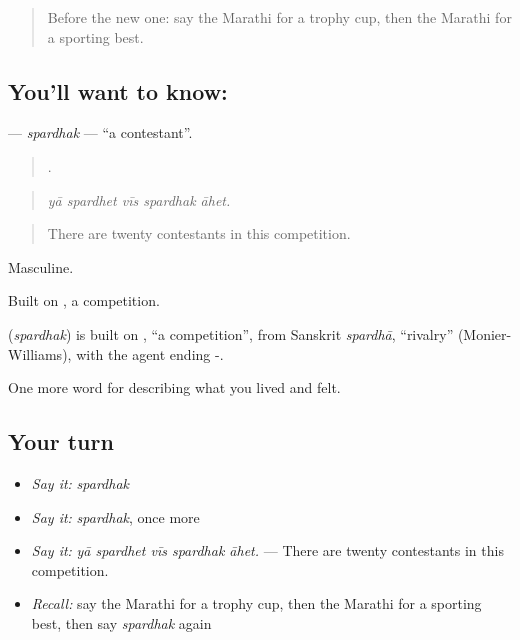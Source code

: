 \label{lesson:MR-C530-spardhak}



\begin{quote}
Before the new one: say the Marathi for a trophy cup, then the Marathi for a sporting best.
\end{quote}

\subsection*{You'll want to know: }
\textbf{} — \emph{spardhak} — \textquotedblleft{}a contestant\textquotedblright{}.

\begin{quote}
    .
\end{quote}

\begin{quote}
\emph{yā spardhet vīs spardhak āhet.}
\end{quote}

\begin{quote}
There are twenty contestants in this competition.
\end{quote}

Masculine.

Built on , a competition.

\begin{cousinweb}
\textbf{} (\emph{spardhak}) is built on , \textquotedblleft{}a competition\textquotedblright{}, from Sanskrit \emph{spardhā}, \textquotedblleft{}rivalry\textquotedblright{} (Monier-Williams), with the agent ending -.
\end{cousinweb}

\begin{grammarlens}[title={What you've built}]
One more word for describing what you lived and felt.
\end{grammarlens}

\subsection*{Your turn}
\begin{itemize}
\raggedright
  \item \emph{Say it:} \emph{spardhak}
  \item \emph{Say it:} \emph{spardhak}, once more
  \item \emph{Say it:} \emph{yā spardhet vīs spardhak āhet.} — There are twenty contestants in this competition.
  \item \emph{Recall:} say the Marathi for a trophy cup, then the Marathi for a sporting best, then say \emph{spardhak} again
\end{itemize}

